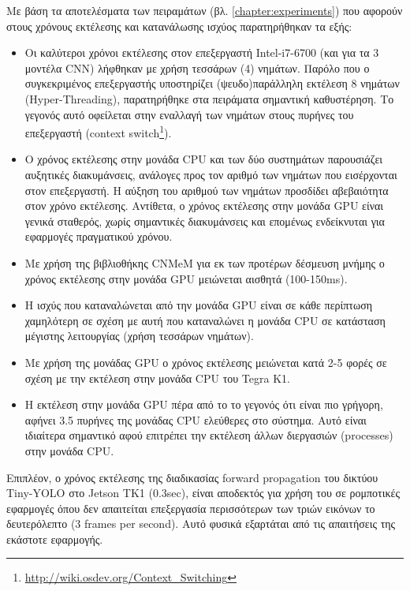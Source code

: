 Με βάση τα αποτελέσματα των πειραμάτων (βλ. \autoref{chapter:experiments})
που αφορούν στους χρόνους εκτέλεσης και κατανάλωσης ισχύος παρατηρήθηκαν τα
εξής:
\begin{itemize}
  \item{
      Οι καλύτεροι χρόνοι εκτέλεσης στον επεξεργαστή Intel-i7-6700 (και για τα 3 μοντέλα CNN)
      λήφθηκαν με χρήση τεσσάρων (4) νημάτων.
      Παρόλο που ο συγκεκριμένος επεξεργαστής υποστηρίζει (ψευδο)παράλληλη
      εκτέλεση 8 νημάτων (Hyper-Threading), παρατηρήθηκε στα πειράματα σημαντική
      καθυστέρηση. Το γεγονός αυτό οφείλεται στην εναλλαγή των νημάτων στους
      πυρήνες του επεξεργαστή
      (context switch\footnote{\url{http://wiki.osdev.org/Context_Switching}}).
    }
  \item{
      Ο χρόνος εκτέλεσης στην μονάδα CPU και των δύο συστημάτων παρουσιάζει αυξητικές διακυμάνσεις,
      ανάλογες προς τον αριθμό των νημάτων που εισέρχονται στον επεξεργαστή.
      Η αύξηση του αριθμού των νημάτων προσδίδει αβεβαιότητα στον χρόνο
      εκτέλεσης. Αντίθετα, ο χρόνος εκτέλεσης στην μονάδα GPU είναι γενικά σταθερός,
      χωρίς σημαντικές διακυμάνσεις και επομένως ενδείκνυται για εφαρμογές
      πραγματικού χρόνου.
      }
  \item{
      Με χρήση της βιβλιοθήκης CNMeM για εκ των προτέρων δέσμευση μνήμης
      ο χρόνος εκτέλεσης στην μονάδα GPU μειώνεται αισθητά (100-150ms).
    }
  \item{
      Η ισχύς που καταναλώνεται από την μονάδα GPU είναι σε κάθε περίπτωση χαμηλότερη σε σχέση
      με αυτή που καταναλώνει η μονάδα CPU σε κατάσταση μέγιστης
      λειτουργίας (χρήση τεσσάρων νημάτων).
    }
  \item{
      Με χρήση της μονάδας GPU ο χρόνος εκτέλεσης μειώνεται κατά
      2-5 φορές σε σχέση με την εκτέλεση στην μονάδα CPU του Tegra K1.
    }
  \item{
      Η εκτέλεση στην μονάδα GPU πέρα από το το γεγονός ότι είναι πιο γρήγορη,
      αφήνει 3.5 πυρήνες της μονάδας CPU ελεύθερες στο σύστημα.
      Αυτό είναι ιδιαίτερα σημαντικό αφού επιτρέπει την εκτέλεση άλλων
      διεργασιών (processes) στην μονάδα CPU.
    }
\end{itemize}

Επιπλέον, ο χρόνος εκτέλεσης της διαδικασίας forward propagation του
δικτύου Tiny-YOLO στο Jetson TK1 (0.3sec), είναι αποδεκτός
για χρήση του σε ρομποτικές εφαρμογές όπου δεν απαιτείται επεξεργασία
περισσότερων των τριών εικόνων το δευτερόλεπτο (3 frames per second). Αυτό
φυσικά εξαρτάται από τις απαιτήσεις της εκάστοτε εφαρμογής.


